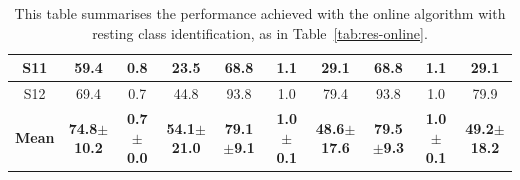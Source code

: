\begin{table}[ht!]
\begin{adjustbox}{center}
{\begin{tabular}{c|c|c|c||c|c|c||c|c|c||}
 \multicolumn{1}{|c|}{S11} &     59.4 &      0.8 &     23.5 &     68.8 &      1.1 &     29.1 &     68.8 &      1.1 &     29.1 \\ \hline
 \multicolumn{1}{|c|}{S12} &     69.4 &      0.7 &    44.8 &     93.8 &      1.0 &     79.4 &     93.8 &      1.0 &     79.9 \\ \hline
\multicolumn{1}{|c|}{\textbf{Mean}} & \textbf{74.8$\pm$10.2} & \textbf{0.7$\pm$0.0} & \textbf{54.1$\pm$21.0} & \textbf{79.1$\pm$9.1} & \textbf{1.0$\pm$0.1} & \textbf{48.6$\pm$17.6} & \textbf{79.5$\pm$9.3} & \textbf{1.0$\pm$0.1} & \textbf{49.2$\pm$18.2} \\ \hline
\end{tabular}}
\end{adjustbox}
\caption{This table summarises the performance achieved with the online algorithm with resting class identification, as in Table~\ref{tab:res-online}.
}

\label{tab:res-online-resting}
\end{table}

